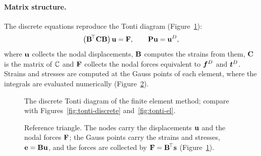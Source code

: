 \paragraph{Matrix structure.} The discrete equations reproduce the Tonti
%
diagram (Figure~\ref{fig:tonti-fem}):
\[
  \bigl(\mathbf{B}^{\!\top}\mathbf{C}\mathbf{B}\bigr)\,\mathbf{u}=\mathbf{F},\qquad \mathbf{P}\mathbf{u}=\mathbf{u}^D,
\]
where $\mathbf{u}$ collects the nodal displacements, $\mathbf{B}$ computes the
strains from them, $\mathbf{C}$ is the matrix of $\mathbb{C}$ and $\mathbf{F}$ collects the
nodal forces equivalent to $\bm{f}^{D}$ and $\bm{t}^{D}$. Strains and stresses are
computed at the Gauss points of each element, where the integrals are
evaluated numerically (Figure~\ref{fig:gauss}).
\begin{figure}[h]
\centering
{}
\caption{The discrete Tonti diagram of the finite element method; compare
with Figures~\ref{fig:tonti-discrete} and~\ref{fig:tonti-el}.}
\label{fig:tonti-fem}
\end{figure}
\begin{figure}[h]
\centering

\caption{Reference triangle. The nodes carry the displacements $\mathbf{u}$ and
the nodal forces $\mathbf{F}$; the Gauss points carry the strains and stresses,
$\mathbf{e}=\mathbf{B}\mathbf{u}$, and the forces are collected by $\mathbf{F}=\mathbf{B}^{\!\top}\mathbf{s}$
(Figure~\ref{fig:tonti-fem}).}
\label{fig:gauss}
\end{figure}

